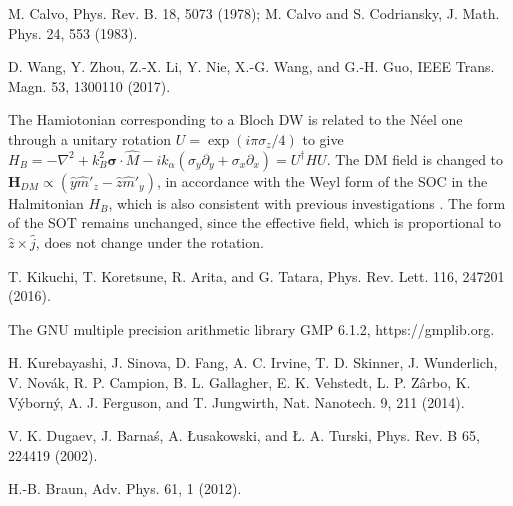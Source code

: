 \documentclass[12pt]{iopart}
\begin{document}
\begin{thebibliography}{99}
M. Calvo, Phys. Rev. B. 18, 5073 (1978); M. Calvo and S. Codriansky, J. Math. Phys. 24, 553 (1983).

D. Wang, Y. Zhou, Z.-X. Li, Y. Nie, X.-G. Wang, and G.-H. Guo, IEEE Trans. Magn. 53, 1300110 (2017).

The Hamiotonian corresponding to a Bloch DW is related to the N\'{e}el one through a unitary rotation $U = \exp {(i \pi \sigma_z/4)}$ to give $H_B = - \nabla ^2 + k_B^2 \bm {\sigma } \cdot \hat {M} - i k_ \alpha (\sigma_y \partial_y + \sigma_x \partial_x)  = U ^\dagger H U$. The DM field is changed to $\textbf{H}_ {DM} \propto (\hat{y} \hat {m}'_z - \hat{z} \hat {m}'_y)$, in accordance with the Weyl form of the SOC in the Halmitonian $H_B$, which is also consistent with previous investigations \cite{Kikuchi16}. The form of the SOT remains unchanged, since the effective field, which is proportional to $\hat {z} \times \hat {j}$, does not change under the rotation.

T. Kikuchi, T. Koretsune, R. Arita, and G. Tatara, Phys. Rev. Lett. 116, 247201 (2016).

The GNU multiple precision arithmetic library GMP 6.1.2, https://gmplib.org.

H. Kurebayashi, J. Sinova, D. Fang, A. C. Irvine, T. D. Skinner, J. Wunderlich, V. Nov\'{a}k, R. P. Campion, B. L. Gallagher, E. K. Vehstedt, L. P. Z\^{a}rbo, K. V\'{y}born\'{y}, A. J. Ferguson, and T. Jungwirth, Nat. Nanotech. 9, 211 (2014).

V. K. Dugaev, J. Barna\'{s}, A. {\L}usakowski, and {\L}. A. Turski, Phys. Rev. B 65, 224419 (2002).

H.-B. Braun, Adv. Phys. 61, 1 (2012).
\end{thebibliography}
\end{document}
